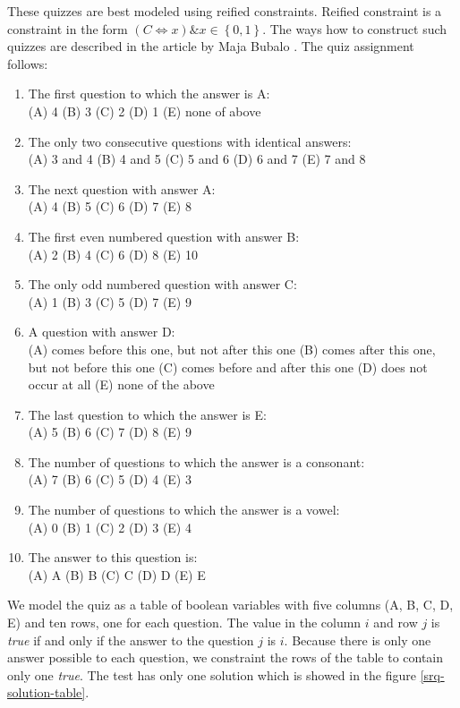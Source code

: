 These quizzes are best modeled using reified constraints. Reified constraint is a constraint
in the form $(C \Leftrightarrow x) \& x \in \left\{0,1\right\}$. The ways how to construct
such quizzes are described in the article by Maja Bubalo \cite{jios:bubalo}.
The quiz assignment follows:

\begin{enumerate}
	\item The first question to which the answer is A:\\
		(A) 4 (B) 3 (C) 2 (D) 1 (E) none of above
	\item The only two consecutive questions with identical answers: \\
		(A) 3 and 4 (B) 4 and 5 (C) 5 and 6 (D) 6 and 7 (E) 7 and 8
	\item The next question with answer A: \\
		(A) 4 (B) 5 (C) 6 (D) 7 (E) 8
	\item The first even numbered question with answer B: \\
		(A) 2 (B) 4 (C) 6 (D) 8 (E) 10 
	\item The only odd numbered question with answer C: \\
		(A) 1 (B) 3 (C) 5 (D) 7 (E) 9
	\item A question with answer D: \\
		(A) comes before this one, but not after this one (B) comes after this one, but not before this one (C) comes before and after this one (D) does not occur at all (E) none of the above
	\item The last question to which the answer is E: \\
		(A) 5 (B) 6 (C) 7 (D) 8 (E) 9
	\item The number of questions to which the answer is a consonant: \\
		(A) 7 (B) 6 (C) 5 (D) 4 (E) 3
	\item The number of questions to which the answer is a vowel: \\
		(A) 0 (B) 1 (C) 2 (D) 3 (E) 4
	\item The answer to this question is: \\
		(A) A (B) B (C) C (D) D (E) E
\end{enumerate}

We model the quiz as a table of boolean variables with five columns (A, B, C, D, E) 
and ten rows, one for each question. The value in the column $i$ and row $j$ is
{\em true} if and only if the answer to the question $j$ is $i$. Because there is only one
answer possible to each question, we constraint the rows of the table to contain
only one {\em true}. The test has only one solution which is showed in the figure 
\ref{srq-solution-table}.  
 
